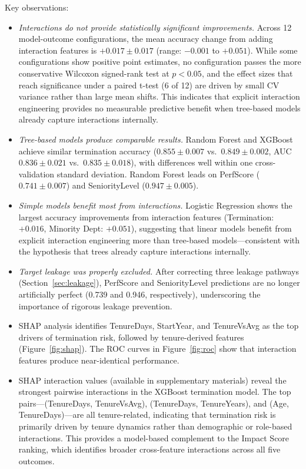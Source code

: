 \documentclass[conference]{IEEEtran}
\begin{document}
Key observations:
\begin{itemize}
    \item \textit{Interactions do not provide statistically significant improvements.} Across 12 model-outcome configurations, the mean accuracy change from adding interaction features is $+0.017\pm0.017$ (range: $-0.001$ to $+0.051$). While some configurations show positive point estimates, no configuration passes the more conservative Wilcoxon signed-rank test at $p<0.05$, and the effect sizes that reach significance under a paired t-test (6 of 12) are driven by small CV variance rather than large mean shifts. This indicates that explicit interaction engineering provides no measurable predictive benefit when tree-based models already capture interactions internally.
    \item \textit{Tree-based models produce comparable results.} Random Forest and XGBoost achieve similar termination accuracy ($0.855\pm0.007$ vs.\ $0.849\pm0.002$, AUC $0.836\pm0.021$ vs.\ $0.835\pm0.018$), with differences well within one cross-validation standard deviation. Random Forest leads on PerfScore ($0.741\pm0.007$) and SeniorityLevel ($0.947\pm0.005$).
    \item \textit{Simple models benefit most from interactions.} Logistic Regression shows the largest accuracy improvements from interaction features (Termination: $+0.016$, Minority Dept: $+0.051$), suggesting that linear models benefit from explicit interaction engineering more than tree-based models---consistent with the hypothesis that trees already capture interactions internally.
    \item \textit{Target leakage was properly excluded.} After correcting three leakage pathways (Section~\ref{sec:leakage}), PerfScore and SeniorityLevel predictions are no longer artificially perfect (0.739 and 0.946, respectively), underscoring the importance of rigorous leakage prevention.
    \item SHAP analysis identifies TenureDays, StartYear, and TenureVsAvg as the top drivers of termination risk, followed by tenure-derived features (Figure~\ref{fig:shap}). The ROC curves in Figure~\ref{fig:roc} show that interaction features produce near-identical performance.
    \item SHAP interaction values (available in supplementary materials) reveal the strongest pairwise interactions in the XGBoost termination model. The top pairs---(TenureDays, TenureVsAvg), (TenureDays, TenureYears), and (Age, TenureDays)---are all tenure-related, indicating that termination risk is primarily driven by tenure dynamics rather than demographic or role-based interactions. This provides a model-based complement to the Impact Score ranking, which identifies broader cross-feature interactions across all five outcomes.
\end{itemize}
\end{document}
